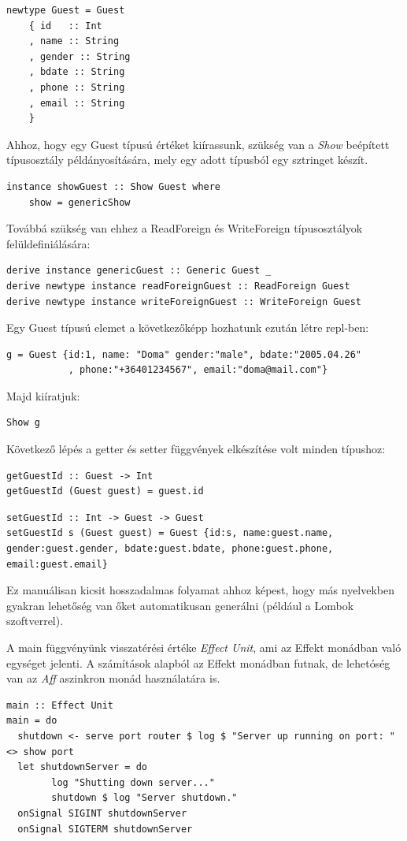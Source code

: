 \documentclass[12pt]{article}
\begin{document}
\begin{verbatim}
newtype Guest = Guest
    { id   :: Int
    , name :: String
    , gender :: String
    , bdate :: String
    , phone :: String
    , email :: String
    }
\end{verbatim}
Ahhoz, hogy egy Guest típusú értéket kiírassunk, szükség van a \textit{Show} beépített típusosztály példányosítására, mely egy adott típusból egy sztringet készít.
\begin{verbatim}
instance showGuest :: Show Guest where
    show = genericShow
\end{verbatim}
Továbbá szükség van ehhez a ReadForeign és WriteForeign típusosztályok felüldefiniálására:
\begin{verbatim}
derive instance genericGuest :: Generic Guest _
derive newtype instance readForeignGuest :: ReadForeign Guest
derive newtype instance writeForeignGuest :: WriteForeign Guest
\end{verbatim}
Egy Guest típusú elemet a következőképp hozhatunk ezután létre repl-ben:
\begin{verbatim}
g = Guest {id:1, name: "Doma" gender:"male", bdate:"2005.04.26"
           , phone:"+36401234567", email:"doma@mail.com"}
\end{verbatim}
Majd kiíratjuk:
\begin{verbatim}
Show g
\end{verbatim}
Következő lépés a getter és setter függvények elkészítése volt minden típushoz:
\begin{verbatim}
getGuestId :: Guest -> Int
getGuestId (Guest guest) = guest.id
\end{verbatim}

\begin{verbatim}
setGuestId :: Int -> Guest -> Guest
setGuestId s (Guest guest) = Guest {id:s, name:guest.name, gender:guest.gender, bdate:guest.bdate, phone:guest.phone, email:guest.email}
\end{verbatim}
Ez manuálisan kicsit hosszadalmas folyamat ahhoz képest, hogy más nyelvekben gyakran lehetőség van őket automatikusan generálni (például a Lombok szoftverrel). 

A main függvényünk visszatérési értéke \textit{Effect Unit}, ami az Effekt monádban való egységet jelenti.  A számítások alapból az Effekt monádban futnak, de lehetóség van az \textit{Aff} aszinkron monád használatára is.
\begin{verbatim}
main :: Effect Unit
main = do
  shutdown <- serve port router $ log $ "Server up running on port: " <> show port
  let shutdownServer = do
        log "Shutting down server..."
        shutdown $ log "Server shutdown."
  onSignal SIGINT shutdownServer
  onSignal SIGTERM shutdownServer
\end{verbatim}
\end{document}
